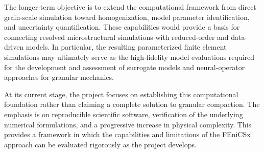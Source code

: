 The longer-term objective is to extend the computational framework from direct grain-scale simulation toward homogenization, model parameter identification, and uncertainty quantification. 
These capabilities would provide a basis for connecting resolved microstructural simulations with reduced-order and data-driven models. 
In particular, the resulting parameterized finite element simulations may ultimately serve as the high-fidelity model evaluations required for the development and assessment of surrogate models and neural-operator approaches for granular mechanics.

At its current stage, the project focuses on establishing this computational foundation rather than claiming a complete solution to granular compaction. 
The emphasis is on reproducible scientific software, verification of the underlying numerical formulations, and a progressive increase in physical complexity. 
This provides a framework in which the capabilities and limitations of the FEniCSx approach can be evaluated rigorously as the project develops.

